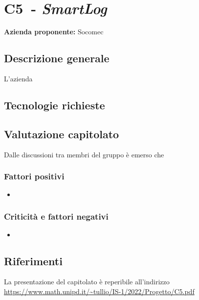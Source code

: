 
\renewcommand{\capName}{\textit{SmartLog}} %
\renewcommand{\capCode}{C5} %
\renewcommand{\capLink}{https://www.math.unipd.it/~tullio/IS-1/2022/Progetto/C5.pdf} %
\renewcommand{\capProposer}{Socomec} %


\section{\capCode\ - \capName}
\textbf{Azienda proponente:} Socomec
\subsection{Descrizione generale}
L'azienda
\subsection{Tecnologie richieste}

\subsection{Valutazione capitolato}
Dalle discussioni tra membri del gruppo è emerso che

\subsubsection{Fattori positivi}

\begin{itemize}
    \item 
\end{itemize}

\subsubsection{Criticità e fattori negativi}

\begin{itemize}
    \item 
\end{itemize}

\subsection{Riferimenti}
La presentazione del capitolato è reperibile all'indirizzo \url{\capLink}